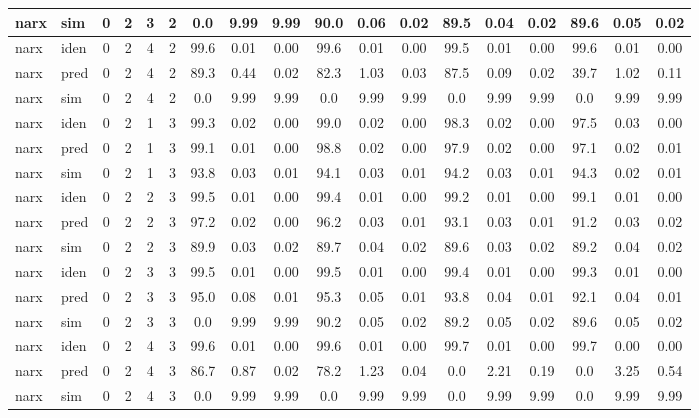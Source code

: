 \begin{landscape}
\begin{center}
\begin{longtable}{ll|cccc|ccc|ccc|ccc|ccc}
narx & sim  & 0 & 2 & 3 & 2 & 0.0 & 9.99 & 9.99 & 90.0 & 0.06 & 0.02 & 89.5 & 0.04 & 0.02 & 89.6 & 0.05 & 0.02 \\ 
 \hline 
narx & iden & 0 & 2 & 4 & 2 & 99.6 & 0.01 & 0.00 & 99.6 & 0.01 & 0.00 & 99.5 & 0.01 & 0.00 & 99.6 & 0.01 & 0.00 \\ 
narx & pred & 0 & 2 & 4 & 2 & 89.3 & 0.44 & 0.02 & 82.3 & 1.03 & 0.03 & 87.5 & 0.09 & 0.02 & 39.7 & 1.02 & 0.11 \\ 
narx & sim  & 0 & 2 & 4 & 2 & 0.0 & 9.99 & 9.99 & 0.0 & 9.99 & 9.99 & 0.0 & 9.99 & 9.99 & 0.0 & 9.99 & 9.99 \\ 
 \hline 
narx & iden & 0 & 2 & 1 & 3 & 99.3 & 0.02 & 0.00 & 99.0 & 0.02 & 0.00 & 98.3 & 0.02 & 0.00 & 97.5 & 0.03 & 0.00 \\ 
narx & pred & 0 & 2 & 1 & 3 & 99.1 & 0.01 & 0.00 & 98.8 & 0.02 & 0.00 & 97.9 & 0.02 & 0.00 & 97.1 & 0.02 & 0.01 \\ 
narx & sim  & 0 & 2 & 1 & 3 & 93.8 & 0.03 & 0.01 & 94.1 & 0.03 & 0.01 & 94.2 & 0.03 & 0.01 & 94.3 & 0.02 & 0.01 \\ 
 \hline 
narx & iden & 0 & 2 & 2 & 3 & 99.5 & 0.01 & 0.00 & 99.4 & 0.01 & 0.00 & 99.2 & 0.01 & 0.00 & 99.1 & 0.01 & 0.00 \\ 
narx & pred & 0 & 2 & 2 & 3 & 97.2 & 0.02 & 0.00 & 96.2 & 0.03 & 0.01 & 93.1 & 0.03 & 0.01 & 91.2 & 0.03 & 0.02 \\ 
narx & sim  & 0 & 2 & 2 & 3 & 89.9 & 0.03 & 0.02 & 89.7 & 0.04 & 0.02 & 89.6 & 0.03 & 0.02 & 89.2 & 0.04 & 0.02 \\ 
 \hline 
narx & iden & 0 & 2 & 3 & 3 & 99.5 & 0.01 & 0.00 & 99.5 & 0.01 & 0.00 & 99.4 & 0.01 & 0.00 & 99.3 & 0.01 & 0.00 \\ 
narx & pred & 0 & 2 & 3 & 3 & 95.0 & 0.08 & 0.01 & 95.3 & 0.05 & 0.01 & 93.8 & 0.04 & 0.01 & 92.1 & 0.04 & 0.01 \\ 
narx & sim  & 0 & 2 & 3 & 3 & 0.0 & 9.99 & 9.99 & 90.2 & 0.05 & 0.02 & 89.2 & 0.05 & 0.02 & 89.6 & 0.05 & 0.02 \\ 
 \hline 
narx & iden & 0 & 2 & 4 & 3 & 99.6 & 0.01 & 0.00 & 99.6 & 0.01 & 0.00 & 99.7 & 0.01 & 0.00 & 99.7 & 0.00 & 0.00 \\ 
narx & pred & 0 & 2 & 4 & 3 & 86.7 & 0.87 & 0.02 & 78.2 & 1.23 & 0.04 & 0.0 & 2.21 & 0.19 & 0.0 & 3.25 & 0.54 \\ 
narx & sim  & 0 & 2 & 4 & 3 & 0.0 & 9.99 & 9.99 & 0.0 & 9.99 & 9.99 & 0.0 & 9.99 & 9.99 & 0.0 & 9.99 & 9.99 \\ 
 \hline 
\end{longtable} 
\end{center} 
 \end{landscape}